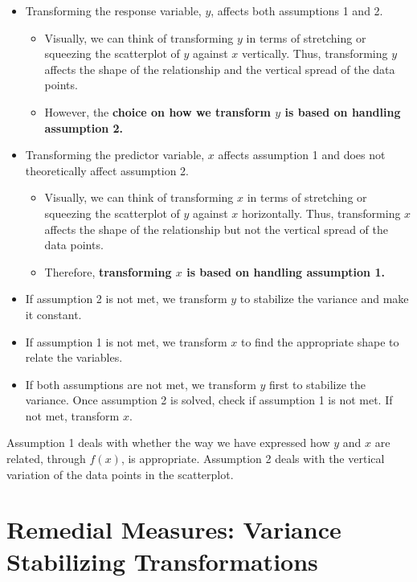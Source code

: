 \documentclass[
]{book}
\providecommand{\tightlist}{%
  \setlength{\itemsep}{0pt}\setlength{\parskip}{0pt}}
\begin{document}
\begin{itemize}
\tightlist
\item
  Transforming the response variable, \(y\), affects both assumptions 1 and 2.

  \begin{itemize}
  \tightlist
  \item
    Visually, we can think of transforming \(y\) in terms of stretching or squeezing the scatterplot of \(y\) against \(x\) vertically. Thus, transforming \(y\) affects the shape of the relationship and the vertical spread of the data points.
  \item
    However, the \textbf{choice on how we transform \(y\) is based on handling assumption 2.}
  \end{itemize}
\item
  Transforming the predictor variable, \(x\) affects assumption 1 and does not theoretically affect assumption 2.

  \begin{itemize}
  \tightlist
  \item
    Visually, we can think of transforming \(x\) in terms of stretching or squeezing the scatterplot of \(y\) against \(x\) horizontally. Thus, transforming \(x\) affects the shape of the relationship but not the vertical spread of the data points.
  \item
    Therefore, \textbf{transforming \(x\) is based on handling assumption 1.}
  \end{itemize}
\item
  If assumption 2 is not met, we transform \(y\) to stabilize the variance and make it constant.
\item
  If assumption 1 is not met, we transform \(x\) to find the appropriate shape to relate the variables.
\item
  If both assumptions are not met, we transform \(y\) first to stabilize the variance. Once assumption 2 is solved, check if assumption 1 is not met. If not met, transform \(x\).
\end{itemize}

Assumption 1 deals with whether the way we have expressed how \(y\) and \(x\) are related, through \(f(x)\), is appropriate. Assumption 2 deals with the vertical variation of the data points in the scatterplot.

\hypertarget{remedial-measures-variance-stabilizing-transformations}{%
\section{Remedial Measures: Variance Stabilizing Transformations}\label{remedial-measures-variance-stabilizing-transformations}}
\end{document}
